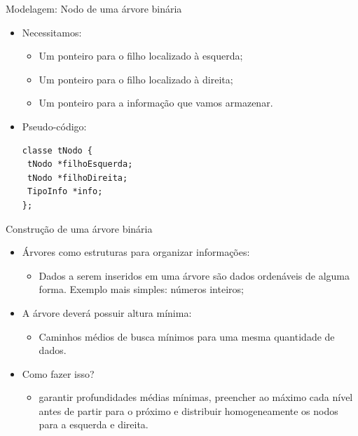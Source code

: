 \documentclass[12pt,table,xcolor={dvipsnames}]{beamer}
\begin{document}
\begin{frame}[fragile]{Modelagem: Nodo de uma árvore binária}
          \begin{itemize}
          \item Necessitamos:
          \begin{itemize}
          \item Um ponteiro para o filho localizado à esquerda;
          \item Um ponteiro para o filho localizado à direita;
          \item Um ponteiro para a informação que vamos armazenar.
          \end{itemize}
          \item Pseudo-código:
          \begin{lstlisting}
classe tNodo {
 tNodo *filhoEsquerda;
 tNodo *filhoDireita;
 TipoInfo *info;
};
		  \end{lstlisting}
       	  \end{itemize}
\end{frame} 

\begin{frame}[fragile]{Construção de uma árvore binária}
          \begin{itemize}
          \item Árvores como estruturas para organizar informações:
          \begin{itemize}
          \item Dados a serem inseridos em uma árvore são dados ordenáveis de alguma forma. Exemplo mais simples: números inteiros;
          \end{itemize}
          \item A árvore deverá possuir altura mínima:
          \begin{itemize}
          \item Caminhos médios de busca mínimos para uma mesma quantidade de dados.
          \end{itemize}
          \item Como fazer isso?
          \begin{itemize}
          \item garantir profundidades médias mínimas, preencher ao máximo cada nível antes de partir para o próximo e distribuir homogeneamente os nodos para a esquerda e direita.
          \end{itemize}
       	  \end{itemize}
\end{frame} 
\end{document}
